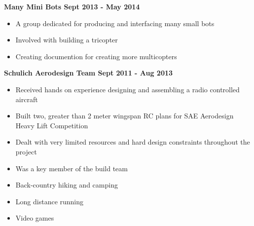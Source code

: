 \documentclass[12pt]{article}
\begin{document}
\noindent \centerline{\bf Many Mini Bots \hfill Sept 2013 - May 2014}
\begin{itemize}
  \item A group dedicated for producing and interfacing many small bots
  \item Involved with building a tricopter
  \item Creating documention for creating more multicopters
\end{itemize}

\noindent \centerline{ \bf Schulich Aerodesign Team \hfill Sept 2011 - Aug 2013}
\begin{itemize}
  \item Received hands on experience  designing and assembling a radio controlled aircraft
  \item Built two, greater than 2 meter wingspan RC plans for SAE Aerodesign Heavy Lift Competition
  \item Dealt with very limited resources and hard design constraints throughout the project
  \item Was a key member of the build team
\end{itemize}

\bigskip
{}
\medskip
\begin{itemize}
\item Back-country hiking and camping
\item Long distance running
\item Video games
\end{itemize}
\bigskip
\end{document}
